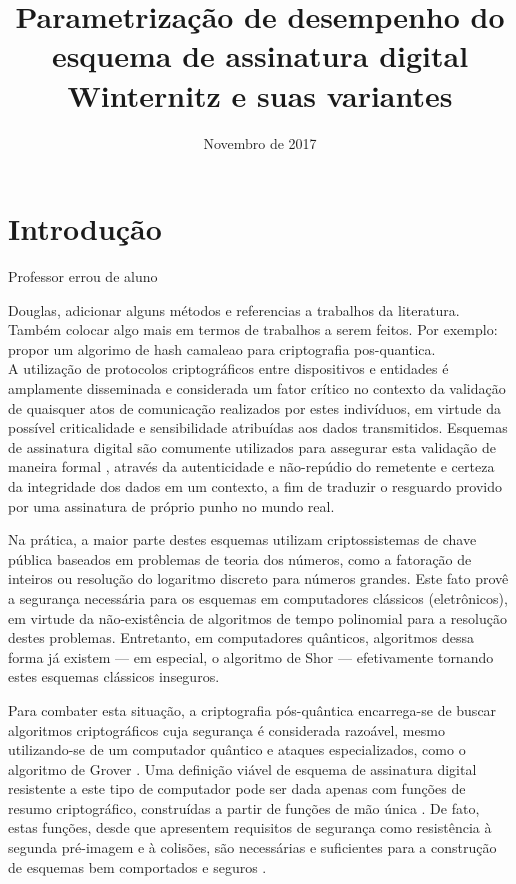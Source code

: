 \documentclass[12pt]{article}
\title{Parametrização de desempenho do esquema de assinatura digital Winternitz e suas variantes}
\author{Novembro de 2017}
\date{}
\begin{document}
\maketitle

\section{Introdução}

Professor errou de aluno

  Douglas, adicionar alguns métodos e referencias a trabalhos da literatura. Também colocar algo mais em termos de trabalhos a serem feitos. Por exemplo: propor um algorimo de hash camaleao para criptografia pos-quantica.\\ 

A utilização de protocolos criptográficos entre dispositivos e entidades é
amplamente disseminada e considerada um fator crítico no contexto da validação
de quaisquer atos de comunicação realizados por estes indivíduos, em virtude da
possível criticalidade e sensibilidade atribuídas aos dados transmitidos.
Esquemas de assinatura digital são comumente utilizados para assegurar esta
validação de maneira formal \cite{Goldreich:2004:FCV:975541}, através da
autenticidade e não-repúdio do remetente e certeza da integridade dos dados em
um contexto, a fim de traduzir o resguardo provido por uma assinatura de
próprio punho no mundo real.

Na prática, a maior parte destes esquemas utilizam criptossistemas de chave
pública baseados em problemas de teoria dos números, como a fatoração de
inteiros ou resolução do logaritmo discreto para números grandes. Este fato
provê a segurança necessária para os esquemas em computadores clássicos
(eletrônicos), em virtude da não-existência de algoritmos de tempo polinomial
para a resolução destes problemas. Entretanto, em computadores quânticos,
algoritmos dessa forma já existem --- em especial, o algoritmo de Shor
\cite{Shor:1997:PAP:264393.264406} --- efetivamente tornando estes esquemas clássicos inseguros. 

Para combater esta situação, a criptografia pós-quântica encarrega-se de buscar
algoritmos criptográficos cuja segurança é considerada razoável, mesmo
utilizando-se de um computador quântico e ataques especializados, como o
algoritmo de Grover \cite{Grover:1996:FQM:237814.237866}. Uma definição viável
de esquema de assinatura digital resistente a este tipo de computador pode ser
dada apenas com funções de resumo criptográfico, construídas a partir de
funções de mão única \cite{cryptoeprint:2005:328}. De fato, estas funções,
desde que apresentem requisitos de segurança como resistência à segunda
pré-imagem e à colisões, são necessárias e suficientes para a construção de
esquemas bem comportados e seguros \cite{Rompel:1990:OFN:100216.100269}.
\end{document}
